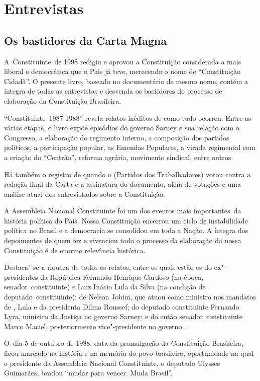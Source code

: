 \part{Entrevistas}

\chapter{Os bastidores da Carta Magna}

A~Constituinte~de 1998 redigiu e aprovou a Constituição considerada a
mais liberal e democrática que o Pais já teve, merecendo o nome de
``Constituição Cidadã''. O presente livro, baseado no documentário de
mesmo nome, contém a íntegra de todas as entrevistas e desvenda os
bastidores do processo de elaboração da Constituição Brasileira.

``Constituinte~1987-1988'' revela relatos inéditos de como tudo ocorreu.
Entre as várias etapas, o livro expõe episódios do governo Sarney e sua
relação com o Congresso, a elaboração do regimento interno, a composição
dos partidos políticos, a participação popular, as Emendas Populares, a
virada regimental com a criação do ``Centrão'', reforma agrária,
movimento sindical, entre outros.

Há também o registro de quando o  (Partidos dos Trabalhadores) votou
contra a redação final da Carta e a assinatura do documento, além de
votações e uma análise atual dos entrevistados sobre a Constituição.

A Assembleia Nacional Constituinte foi um dos eventos mais
importantes~da história política do País. Nossa Constituição encerrou um
ciclo de instabilidade política no Brasil e a democracia se consolidou
em toda a Nação. A íntegra dos depoimentos de quem fez e vivenciou todo
o processo da elaboração da nossa Constituição é de enorme relevância
histórica.

Destaca"-se a riqueza de todos os relatos, entre os quais estão os do
ex"-presidentes da República Fernando Henrique Cardoso (na época,
senador~constituinte) e Luiz Inácio Lula da Silva (na condição de
deputado~constituinte); de Nelson Jobim, que atuou como ministro nos
mandatos de , Lula e da presidenta Dilma Roussef; do deputado
constituinte Fernando Lyra, ministro da Justiça no governo Sarney; e do
então senador~constituinte Marco Maciel, posteriormente vice"-presidente
no governo .~

O~dia 5 de outubro de 1988, data da promulgação da Constituição
Brasileira, ficou marcado na história e na memória do povo brasileiro,
oportunidade na qual o presidente da Assembleia Nacional Constituinte, o
deputado Ulysses Guimarães, bradou ``mudar para vencer. Muda Brasil''.


